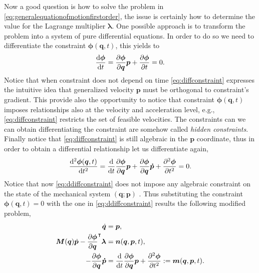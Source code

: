 		Now a good question is how to solve the problem in \cref{eq:generalequationofmotionfirstorder}, the issue is certainly how to determine the value for the Lagrange multiplier $\bm{\lambda}$. One possible approach is to transform the problem into a system of pure differential equations. In order to do so we need to differentiate the constraint $\bm{\phi}(\bm{q},t)$, this yields to
		\begin{equation}
			\label{eq:diffconstraint}
			\frac{\mathop{}\!\mathrm{d}\bm{\phi}}{\mathop{}\!\mathrm{d} t} = \frac{\partial\bm{\phi}}{\partial\bm{q}}\bm{p}+\frac{\partial\bm{\phi}}{\partial t}=0.
		\end{equation}
		Notice that when constraint does not depend on time \cref{eq:diffconstraint} expresses the intuitive idea that generalized velocity $\bm{p}$ must be orthogonal to constraint's gradient. This provide also the opportunity to notice that constraint $\bm{\phi}(\bm{q},t)$ imposes relationships also at the velocity and acceleration level, e.g., \cref{eq:diffconstraint} restricts the set of feasible velocities. The constraints can we can obtain differentiating the constraint are somehow called \emph{hidden constraints}. Finally notice that \cref{eq:diffconstraint} is still algebraic in the $\bm{p}$ coordinate, thus in order to obtain a differential relationship let us differentiate again,
		\begin{equation}
			\label{eq:ddiffconstraint}
			\frac{\mathop{}\!\mathrm{d}^2\bm{\phi}(\bm{q},t)}{\mathop{}\!\mathrm{d} t^2} = \frac{\mathop{}\!\mathrm{d}}{\mathop{}\!\mathrm{d} t}\frac{\partial\bm{\phi}}{\partial\bm{q}}\bm{p} +\frac{\partial\bm{\phi}}{\partial\bm{q}}\bm{\dot{p}}+\frac{\partial^2\bm{\phi}}{\partial t^2}=0.
		\end{equation}
		Notice that now \cref{eq:ddiffconstraint} does not impose any algebraic constraint on the state of the mechanical system $(\bm{q};\bm{p})$ . Thus substituting the constraint $\bm{\phi}(\bm{q},t) = 0$ with the one in \cref{eq:ddiffconstraint} results the following modified problem,
		\begin{subequations}
		\label{eq:generalequationofmotionfirstorderdiffconstraint}
			\begin{align}
				\dot{\bm{q}} &= \bm{p}, \\
				\bm{M}(\bm{q})\dot{\bm{p}} -\frac{\partial\bm{\phi}}{\partial\bm{q}}^{\intercal}\bm{\lambda} &= \bm{n}(\bm{q},\bm{p},t),\\
				-\frac{\partial\bm{\phi}}{\partial\bm{q}}\bm{\dot{p}} &= \frac{\mathop{}\!\mathrm{d}}{\mathop{}\!\mathrm{d} t}\frac{\partial\bm{\phi}}{\partial\bm{q}}\bm{p} +\frac{\partial^2\bm{\phi}}{\partial t^2} := \bm{m}(\bm{q},\bm{p},t).
			\end{align}
		\end{subequations}
